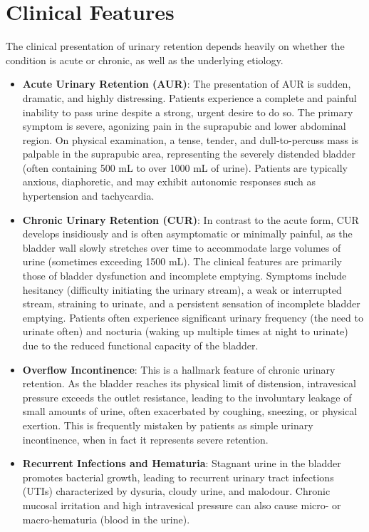\section*{Clinical Features}
The clinical presentation of urinary retention depends heavily on whether the condition is acute or chronic, as well as the underlying etiology.
\begin{itemize}
    \item \textbf{Acute Urinary Retention (AUR)}: The presentation of AUR is sudden, dramatic, and highly distressing. Patients experience a complete and painful inability to pass urine despite a strong, urgent desire to do so. The primary symptom is severe, agonizing pain in the suprapubic and lower abdominal region. On physical examination, a tense, tender, and dull-to-percuss mass is palpable in the suprapubic area, representing the severely distended bladder (often containing 500 mL to over 1000 mL of urine). Patients are typically anxious, diaphoretic, and may exhibit autonomic responses such as hypertension and tachycardia.
    \item \textbf{Chronic Urinary Retention (CUR)}: In contrast to the acute form, CUR develops insidiously and is often asymptomatic or minimally painful, as the bladder wall slowly stretches over time to accommodate large volumes of urine (sometimes exceeding 1500 mL). The clinical features are primarily those of bladder dysfunction and incomplete emptying. Symptoms include hesitancy (difficulty initiating the urinary stream), a weak or interrupted stream, straining to urinate, and a persistent sensation of incomplete bladder emptying. Patients often experience significant urinary frequency (the need to urinate often) and nocturia (waking up multiple times at night to urinate) due to the reduced functional capacity of the bladder.
    \item \textbf{Overflow Incontinence}: This is a hallmark feature of chronic urinary retention. As the bladder reaches its physical limit of distension, intravesical pressure exceeds the outlet resistance, leading to the involuntary leakage of small amounts of urine, often exacerbated by coughing, sneezing, or physical exertion. This is frequently mistaken by patients as simple urinary incontinence, when in fact it represents severe retention.
    \item \textbf{Recurrent Infections and Hematuria}: Stagnant urine in the bladder promotes bacterial growth, leading to recurrent urinary tract infections (UTIs) characterized by dysuria, cloudy urine, and malodour. Chronic mucosal irritation and high intravesical pressure can also cause micro- or macro-hematuria (blood in the urine).
\end{itemize}

